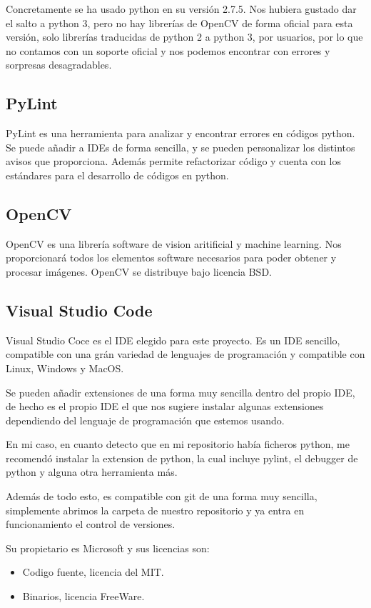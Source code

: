 Concretamente se ha usado python en su versión 2.7.5.
Nos hubiera gustado dar el salto a python 3, pero no hay librerías de OpenCV de forma oficial para esta versión, solo librerías traducidas de python 2 a python 3, por usuarios, por lo que no contamos con un soporte oficial y nos podemos encontrar con errores y sorpresas desagradables.


\subsection{PyLint}
PyLint es una herramienta para analizar y encontrar errores en códigos python. Se puede añadir a IDEs de forma sencilla, y se pueden personalizar los distintos avisos que proporciona. 
Además permite refactorizar código y cuenta con los estándares para el desarrollo de códigos en python.

\subsection{OpenCV}
OpenCV es una librería software de vision aritificial y machine learning. Nos proporcionará todos los elementos software necesarios para poder obtener y procesar imágenes. 
OpenCV se distribuye bajo licencia BSD.

\subsection{Visual Studio Code}
Visual Studio Coce es el IDE elegido para este proyecto. Es un IDE sencillo, compatible con una grán variedad de lenguajes de programación y compatible con Linux, Windows y MacOS.
 
Se pueden añadir extensiones de una forma muy sencilla dentro del propio IDE, de hecho es el propio IDE el que nos sugiere instalar algunas extensiones dependiendo del lenguaje de programación que estemos usando. 

En mi caso, en cuanto detecto que en mi repositorio había ficheros python, me recomendó instalar la extension de python, la cual incluye pylint, el debugger de python y alguna otra herramienta más.

Además de todo esto, es compatible con git de una forma muy sencilla, simplemente abrimos la carpeta de nuestro repositorio y ya entra en funcionamiento el control de versiones.

Su propietario es Microsoft y sus licencias son:
\begin{itemize}
	\item Codigo fuente, licencia del MIT.
	\item Binarios, licencia FreeWare.
\end{itemize}

